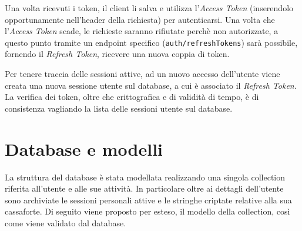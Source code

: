 \documentclass[a4paper]{report}
\begin{document}
Una volta ricevuti i token, il client li salva e utilizza l'\textit{Access Token} (inserendolo opportunamente nell'header della richiesta) per autenticarsi. Una volta che l'\textit{Access Token} scade, le richieste saranno rifiutate perchè non autorizzate, a questo punto tramite un endpoint specifico (\texttt{auth/refreshTokens}) sarà possibile, fornendo il \textit{Refresh Token}, ricevere una nuova coppia di token. 


Per tenere traccia delle sessioni attive, ad un nuovo accesso dell'utente viene creata una nuova sessione utente sul database, a cui è associato il \textit{Refresh Token}. La verifica dei token, oltre che crittografica e di validità di tempo, è di consistenza vagliando la lista delle sessioni utente sul database.

\section{Database e modelli}
La struttura del database è stata modellata realizzando una singola collection riferita all'utente e alle sue attività. In particolare oltre ai dettagli dell'utente sono archiviate le sessioni personali attive e le stringhe criptate relative alla sua cassaforte. Di seguito viene proposto per esteso, il modello della collection, così come viene validato dal database.
\end{document}
